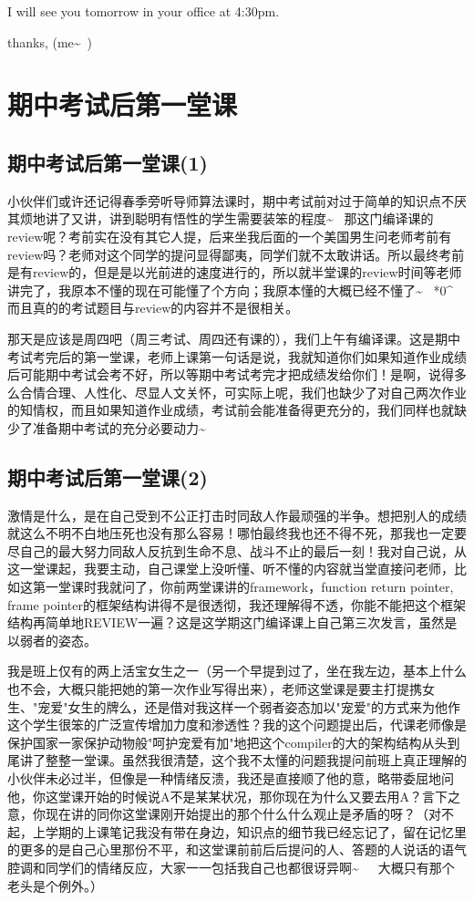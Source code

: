 \documentclass[12pt]{book}
\begin{document}
I will see you tomorrow in your office at 4:30pm. 

thanks,
(me\textasciitilde{}~)

\chapter{期中考试后第一堂课}
\label{sec-36}
\section{期中考试后第一堂课(1)}
\label{sec-36-1}

小伙伴们或许还记得春季旁听导师算法课时，期中考试前对过于简单的知识点不厌其烦地讲了又讲，讲到聪明有悟性的学生需要装笨的程度\textasciitilde{}~ 那这门编译课的review呢？考前实在没有其它人提，后来坐我后面的一个美国男生问老师考前有review吗？老师对这个同学的提问显得鄙夷，同学们就不太敢讲话。所以最终考前是有review的，但是是以光前进的速度进行的，所以就半堂课的review时间等老师讲完了，我原本不懂的现在可能懂了个方向；我原本懂的大概已经不懂了\textasciitilde{}~ *0\^{} 而且真的的考试题目与review的内容并不是很相关。

那天是应该是周四吧（周三考试、周四还有课的），我们上午有编译课。这是期中考试考完后的第一堂课，老师上课第一句话是说，我就知道你们如果知道作业成绩后可能期中考试会考不好，所以等期中考试考完才把成绩发给你们！是啊，说得多么合情合理、人性化、尽显人文关怀，可实际上呢，我们也缺少了对自己两次作业的知情权，而且如果知道作业成绩，考试前会能准备得更充分的，我们同样也就缺少了准备期中考试的充分必要动力\textasciitilde{}~

\section{期中考试后第一堂课(2)}
\label{sec-36-2}

激情是什么，是在自己受到不公正打击时同敌人作最顽强的半争。想把别人的成绩就这么不明不白地压死也没有那么容易！哪怕最终我也还不得不死，那我也一定要尽自己的最大努力同敌人反抗到生命不息、战斗不止的最后一刻！我对自己说，从这一堂课起，我要主动，自己课堂上没听懂、听不懂的内容就当堂直接问老师，比如这第一堂课时我就问了，你前两堂课讲的framework，function return pointer, frame pointer的框架结构讲得不是很透彻，我还理解得不透，你能不能把这个框架结构再简单地REVIEW一遍？这是这学期这门编译课上自己第三次发言，虽然是以弱者的姿态。

我是班上仅有的两上活宝女生之一（另一个早提到过了，坐在我左边，基本上什么也不会，大概只能把她的第一次作业写得出来），老师这堂课是要主打提携女生、"宠爱"女生的牌么，还是借对我这样一个弱者姿态加以"宠爱"的方式来为他作这个学生很笨的广泛宣传增加力度和渗透性？我的这个问题提出后，代课老师像是保护国家一家保护动物般"呵护宠爱有加"地把这个compiler的大的架构结构从头到尾讲了整整一堂课。虽然我很清楚，这个我不太懂的问题我提问前班上真正理解的小伙伴未必过半，但像是一种情绪反溃，我还是直接顺了他的意，略带委屈地问他，你这堂课开始的时候说A不是某某状况，那你现在为什么又要去用A？言下之意，你现在讲的同你这堂课刚开始提出的那个什么什么观止是矛盾的呀？（对不起，上学期的上课笔记我没有带在身边，知识点的细节我已经忘记了，留在记忆里的更多的是自己心里那份不平，和这堂课前前后后提问的人、答题的人说话的语气腔调和同学们的情绪反应，大家一一包括我自己也都很讶异啊\textasciitilde{}~　大概只有那个老头是个例外。）
\end{document}
